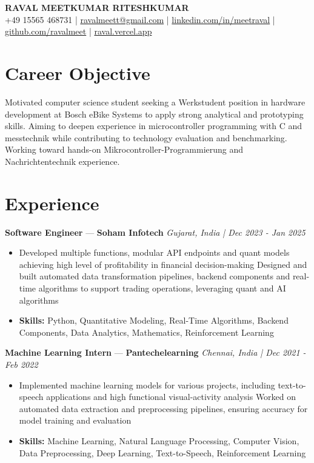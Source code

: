 \documentclass[a4paper,10pt]{article}
\begin{document}
\begin{center}
  {\Large\bfseries RAVAL MEETKUMAR RITESHKUMAR}\\[2pt]
  {\small +49 15565 468731 \;|\; \href{mailto:ravalmeett@gmail.com}{ravalmeett@gmail.com} \;|\; \href{https://www.linkedin.com/in/meetraval/}{linkedin.com/in/meetraval} \;|\; \href{https://github.com/ravalmeet}{github.com/ravalmeet} \;|\; \href{https://raval.vercel.app/}{raval.vercel.app}}
\end{center}
\vspace{-3pt}

\section*{Career Objective}
Motivated computer science student seeking a Werkstudent position in hardware development at Bosch eBike Systems to apply strong analytical and prototyping skills. Aiming to deepen experience in microcontroller programming with C and messtechnik while contributing to technology evaluation and benchmarking. Working toward hands-on Mikrocontroller-Programmierung and Nachrichtentechnik experience.\par

\section*{Experience}
\textbf{Software Engineer} — \textbf{Soham Infotech} \hfill \textit{Gujarat, India \;|\; Dec 2023 - Jan 2025}\par
\vspace{1pt}
\begin{itemize}
  \item Developed multiple functions, modular API endpoints and quant models achieving high level of profitability in financial decision-making Designed and built automated data transformation pipelines, backend components and real-time algorithms to support trading operations, leveraging quant and AI algorithms
  \item \textbf{Skills:} Python, Quantitative Modeling, Real-Time Algorithms, Backend Components, Data Analytics, Mathematics, Reinforcement Learning
\end{itemize}
\vspace{3pt}
\textbf{Machine Learning Intern} — \textbf{Pantechelearning} \hfill \textit{Chennai, India \;|\; Dec 2021 - Feb 2022}\par
\vspace{1pt}
\begin{itemize}
  \item Implemented machine learning models for various projects, including text-to-speech applications and high functional visual-activity analysis Worked on automated data extraction and preprocessing pipelines, ensuring accuracy for model training and evaluation
  \item \textbf{Skills:} Machine Learning, Natural Language Processing, Computer Vision, Data Preprocessing, Deep Learning, Text-to-Speech, Reinforcement Learning
\end{itemize}
\end{document}
